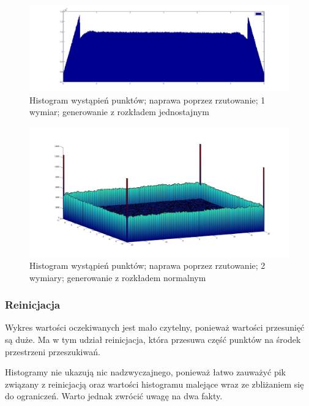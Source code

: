 \documentclass{mini}
\begin{document}
\begin{figure}[H]
\centering
\includegraphics[width=\textwidth]{p_j_100M_1__3_3}
\caption{Histogram wystąpień punktów; naprawa poprzez rzutowanie; 1 wymiar; generowanie z rozkładem jednostajnym}
\label{bladzenie:rzutowanie1dj}
\end{figure}

\begin{figure}[H]
\centering
\includegraphics[width=\textwidth]{p_n_10M_2__20_20__10_10_4_2}
\caption{Histogram wystąpień punktów; naprawa poprzez rzutowanie; 2 wymiary; generowanie z rozkładem normalnym}
\label{bladzenie:rzutowanie2d}
\end{figure}

\subsubsection*{Reinicjacja}
\hspace{3,4ex}Wykres wartości oczekiwanych jest mało czytelny, ponieważ wartości przesunięć są duże. Ma w tym udział reinicjacja, która przesuwa część punktów na środek przestrzeni przeszukiwań.

Histogramy nie ukazują nic nadzwyczajnego, ponieważ łatwo zauważyć pik związany z reinicjacją oraz wartości histogramu malejące wraz ze zbliżaniem się do ograniczeń. Warto jednak zwrócić uwagę na dwa fakty.
\end{document}
